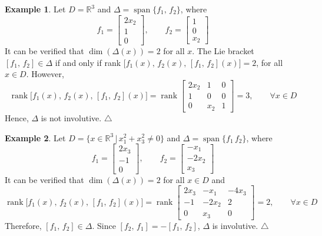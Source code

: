 \documentclass[11pt,a4paper,oneside]{book}
\numberwithin{equation}{section}
\DeclareMathOperator{\rank}{rank}
\DeclareMathOperator{\spn}{span}
\theoremstyle{it}
\theoremstyle{definition}
\newtheorem{example}{Example}[section]
\begin{document}
\begin{example}
	Let $D=\mathbb{R}^3$ and $\Delta =\spn\{f_1,\,f_2\}$, where
	\begin{equation*}
		f_1=\begin{bmatrix} 2x_2 \\[6pt] 1 \\[6pt] 0 \end{bmatrix},\qquad
		f_2=\begin{bmatrix} 1 \\[6pt] 0 \\[6pt] x_2 \end{bmatrix}
	\end{equation*}
	It can be verified that $\dim(\Delta(x))=2$ for all $x$. The Lie bracket $[f_1,\,f_2]\in\Delta$ if and only if rank $\Big[f_1(x),\,f_2(x),\,[f_1,\,f_2](x)\Big]=2$, for all $x\in D$. However,
	\begin{equation*}
		\rank\Big[f_1(x),\,f_2(x),\,[f_1,\,f_2](x)\Big]=\rank\begin{bmatrix} 2x_2 & 1 & 0 \\[6pt] 1 & 0 & 0 \\[6pt] 0 & x_2 & 1	\end{bmatrix}=3,\qquad\forall x\in D
	\end{equation*}
Hence, $\Delta$ is not involutive.
	\hfill$\triangle$
\end{example}
\begin{example}
	Let $D=\{x\in\mathbb{R}^3\,|\,x_1^2+x_3^2\ne0\}$ and $\Delta=\spn\{f_1\,f_2\}$, where
	\begin{equation*}
		f_1=\begin{bmatrix} 2x_3 \\[6pt] -1 \\[6pt] 0 \end{bmatrix},\qquad
		f_2=\begin{bmatrix} -x_1 \\[6pt] -2x_2 \\[6pt] x_3 \end{bmatrix}
	\end{equation*}
	It can be verified that $\dim(\Delta(x))=2$ for all $x\in D$ and
	\begin{equation*}
		\rank\Big[f_1(x),\,f_2(x),\,[f_1,\,f_2](x)\Big]=\rank\begin{bmatrix} 2x_3 & -x_1 & -4x_3 \\[6pt] -1 & -2x_2 & 2 \\[6pt] 0 & x_3 & 0	\end{bmatrix}=2,\qquad\forall x\in D
	\end{equation*}
Therefore, $[f_1,\,f_2]\in\Delta$. Since $[f_2,\,f_1]=-[f_1,\,f_2]$, $\Delta$ is involutive.
		\hfill$\triangle$
\end{example}
\end{document}
